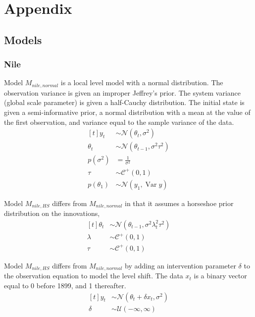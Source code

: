 \documentclass{article}
\newcommand{\paren}[1]{\ensuremath{\left(#1\right)}}
\newcommand{\dnorm}[1]{\ensuremath{\mathcal{N}\paren{#1}}}
\newcommand{\dhalfcauchy}[1]{\ensuremath{\mathcal{C}^{+}\paren{#1}}}
\newcommand{\dunif}[1]{\ensuremath{\mathcal{U}\paren{#1}}}
\DeclareMathOperator{\Var}{Var}
\begin{document}
\clearpage{}
\section{Appendix}
\label{sec:appendix}

\subsection{Models}
\label{sec:models}

\subsubsection{Nile}
\label{sec:nile-1}

Model $M_{nile,normal}$ is a local level model with a normal distribution.
The observation variance is given an improper Jeffrey's prior.
The system variance (global scale parameter) is given a half-Cauchy distribution. 
The initial state is given a semi-informative prior, a normal distribution with a mean at the value of the first observation, and variance equal to the sample variance of the data.
\begin{equation}
  \label{eq:11}
  \begin{aligned}[t]
    y_{t} &\sim \dnorm{\theta_{t}, \sigma^{2}} \\
    \theta_{t} &\sim \dnorm{\theta_{t - 1}, \sigma^{2} \tau^{2}} \\
    p(\sigma^{2}) &= \frac{1}{\sigma^{2}} \\
    \tau &\sim \dhalfcauchy{0, 1} \\
    p(\theta_{1}) &\sim \dnorm{y_{1}, \Var{y}}
  \end{aligned}
\end{equation}

Model $M_{nile,HS}$ differs from $M_{nile,normal}$ in that it assumes a horseshoe prior distribution on 
the innovations,
\begin{equation}
  \label{eq:18}
  \begin{aligned}[t]
    \theta_{t} &\sim \dnorm{\theta_{t - 1}, \sigma^{2} \lambda_{t}^{2} \tau^{2}} \\
    \lambda &\sim \dhalfcauchy{0, 1} \\
    \tau &\sim \dhalfcauchy{0, 1}
  \end{aligned}
\end{equation}

Model $M_{nile,HS}$ differs from $M_{nile,normal}$ by adding an intervention parameter $\delta$ to the observation equation to model the level shift. 
The data $x_{t}$ is a binary vector equal to 0 before 1899, and 1 thereafter.
\begin{equation}
  \label{eq:19}
  \begin{aligned}[t]
    y_{t} &\sim \dnorm{\theta_{t} + \delta x_{t}, \sigma^{2}} \\
    \delta &\sim \dunif{-\infty, \infty}
  \end{aligned}
\end{equation}

\clearpage{}

\printbibliography{}
\end{document}
